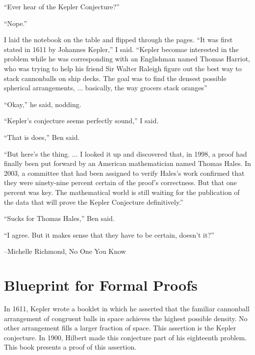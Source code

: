 {

\narrower\parindent=0pt
\baselineskip

{\it

``Ever hear of the Kepler Conjecture?''

``Nope.''

I laid the notebook on the table and flipped through the pages. ``It was first stated
in 1611 by Johannes Kepler,'' I said.  ``Kepler becomae interested in the problem while
he was corresponding with an Englishman named Thomas Harriot, who was trying
to help his friend Sir Walter Raleigh figure out the best way to stack cannonballs on ship
decks.  The goal was to find the densest possible spherical arrangements, $\ldots$ basically,
the way grocers stack oranges''

``Okay,'' he said, nodding.

``Kepler's conjecture {\rm{seems}} perfectly sound,'' I said.

``That is does,'' Ben said.

``But here's the thing. $\ldots$  I looked it up and discovered that, in 1998, a proof
had finally been put forward by an American mathematician named Thomas Hales.  In 2003,
a committee that had been assigned to verify Hales's work confirmed that they were ninety-nine
percent certain of the proof's correctness.  But that one percent was key.  The mathematical
world is still waiting for the publication of the data that will prove the Kepler Conjecture definitively.''

``Sucks for Thomas Hales,'' Ben said.

``I agree.  But it makes sense that they have to be certain, doesn't it?''


{\hfill--Michelle Richmond, No One You Know} %

}

}


\newpage

\section*{Blueprint for Formal Proofs}

In 1611, Kepler wrote a booklet in which he asserted that the familiar
cannonball arrangement of congruent balls in space achieves the
highest possible density.  No other arrangement fills a larger
fraction of space.  This assertion is the Kepler conjecture.  In 1900,
Hilbert made this conjecture part of his eighteenth problem.  This
book presents a proof of this assertion.

